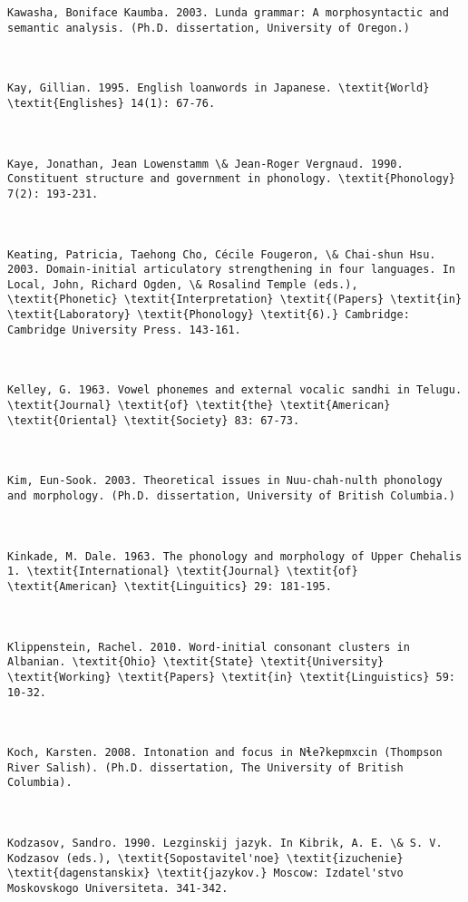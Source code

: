 \begin{verbatim}
Kawasha, Boniface Kaumba. 2003. Lunda grammar: A morphosyntactic and semantic analysis. (Ph.D. dissertation, University of Oregon.)



Kay, Gillian. 1995. English loanwords in Japanese. \textit{World} \textit{Englishes} 14(1): 67-76.



Kaye, Jonathan, Jean Lowenstamm \& Jean-Roger Vergnaud. 1990. Constituent structure and government in phonology. \textit{Phonology} 7(2): 193-231.



Keating, Patricia, Taehong Cho, Cécile Fougeron, \& Chai-shun Hsu. 2003. Domain-initial articulatory strengthening in four languages. In Local, John, Richard Ogden, \& Rosalind Temple (eds.), \textit{Phonetic} \textit{Interpretation} \textit{(Papers} \textit{in} \textit{Laboratory} \textit{Phonology} \textit{6).} Cambridge: Cambridge University Press. 143-161.



Kelley, G. 1963. Vowel phonemes and external vocalic sandhi in Telugu. \textit{Journal} \textit{of} \textit{the} \textit{American} \textit{Oriental} \textit{Society} 83: 67-73.



Kim, Eun-Sook. 2003. Theoretical issues in Nuu-chah-nulth phonology and morphology. (Ph.D. dissertation, University of British Columbia.)



Kinkade, M. Dale. 1963. The phonology and morphology of Upper Chehalis 1. \textit{International} \textit{Journal} \textit{of} \textit{American} \textit{Linguitics} 29: 181-195.



Klippenstein, Rachel. 2010. Word-initial consonant clusters in Albanian. \textit{Ohio} \textit{State} \textit{University} \textit{Working} \textit{Papers} \textit{in} \textit{Linguistics} 59: 10-32.



Koch, Karsten. 2008. Intonation and focus in Nɬeʔkepmxcin (Thompson River Salish). (Ph.D. dissertation, The University of British Columbia).



Kodzasov, Sandro. 1990. Lezginskij jazyk. In Kibrik, A. E. \& S. V.  Kodzasov (eds.), \textit{Sopostavitel'noe} \textit{izuchenie} \textit{dagenstanskix} \textit{jazykov.} Moscow: Izdatel'stvo Moskovskogo Universiteta. 341-342.




\end{verbatim}

